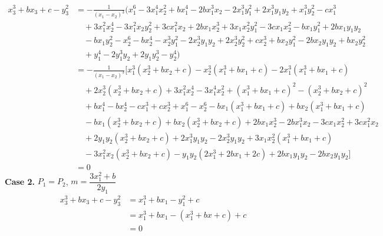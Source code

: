 \documentclass[12pt]{article}
\theoremstyle{definition}
\begin{document}
	\begin{align*}
		x_3^3+bx_3+c-y_3^2&=
		-\frac{1}{(x_1-x_2)^3}(x_1^6 - 3x_1^4x_2^2 + bx_1^4 - 2bx_1^3x_2 - 2x_1^3y_1^2 + 2x_1^3y_1y_2 + x_1^3y_2^2 - cx_1^3 \\
		&\quad + 3x_1^2x_2^4 - 3x_1^2x_2y_2^2 + 3cx_1^2x_2 + 2bx_1x_2^3 + 3x_1x_2^2y_1^2 - 3cx_1x_2^2 - bx_1y_1^2 + 2bx_1y_1y_2 \\
		&\quad  - bx_1y_2^2- x_2^6 - bx_2^4 - x_2^3y_1^2 - 2x_2^3y_1y_2 + 2x_2^3y_2^2 + cx_2^3 + bx_2y_1^2 - 2bx_2y_1y_2 + bx_2y_2^2 \\
		&\quad + y_1^4 - 2y_1^3y_2 + 2y_1y_2^3 - y_2^4)\\
		&=-\frac{1}{(x_1-x_2)^3}[
		x_1^3(x_2^3 + bx_2 + c) - x_2^3(x_1^3 + bx_1 + c) - 2x_1^3(x_1^3 + bx_1 + c)\\
		&\quad + 2x_2^3(x_2^3 + bx_2 + c) + 3x_1^2x_2^4 - 3x_1^4x_2^2 + (x_1^3 + bx_1 + c)^2 - (x_2^3 + bx_2 + c)^2\\
		&\quad + bx_1^4 - bx_2^4 - cx_1^3 + cx_2^3 + x_1^6 - x_2^6 - bx_1(x_1^3 + bx_1 + c) + bx_2(x_1^3 + bx_1 + c)\\
		&\quad - bx_1(x_2^3 + bx_2 + c) + bx_2(x_2^3 + bx_2 + c) + 2bx_1x_2^3 - 2bx_1^3x_2 - 3cx_1x_2^2 + 3cx_1^2x_2\\
		&\quad + 2y_1y_2(x_2^3 + bx_2 + c) + 2x_1^3y_1y_2 - 2x_2^3y_1y_2 + 3x_1x_2^2(x_1^3 + bx_1 + c)\\
		&\quad - 3x_1^2x_2(x_2^3 + bx_2 + c) - y_1y_2(2x_1^3 + 2bx_1 + 2c) + 2bx_1y_1y_2 - 2bx_2y_1y_2]\\
		&=0
	\end{align*}
	\textbf{Case 2.} $P_1=P_2$, $m=\dfrac{3x_1^2+b}{2y_1}$
	\begin{align*}
		x_3^3+bx_3+c-y_3^2&=x_1^3 + bx_1 - y_1^2 + c    \\
		&= x_1^3 + bx_1 - (x_1^3+bx+c) + c \\
		&=0
	\end{align*}
	
\end{document}
